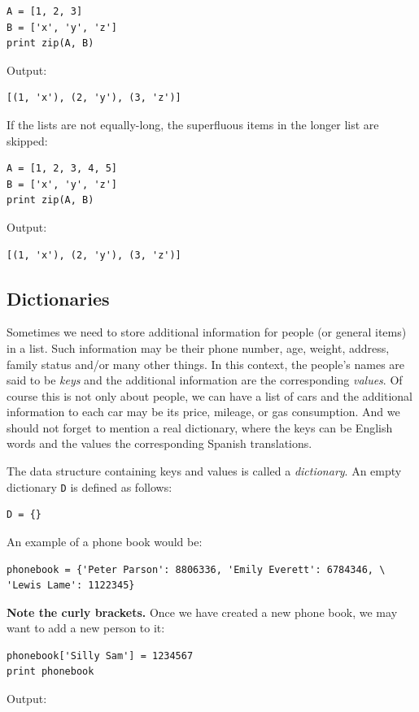 \begin{verbatim}
A = [1, 2, 3]
B = ['x', 'y', 'z']
print zip(A, B)
\end{verbatim}
Output:

\begin{verbatim}
[(1, 'x'), (2, 'y'), (3, 'z')]
\end{verbatim}
If the lists are not equally-long, the superfluous items in the longer list 
are skipped:

\begin{verbatim}
A = [1, 2, 3, 4, 5]
B = ['x', 'y', 'z']
print zip(A, B)
\end{verbatim}
Output:

\begin{verbatim}
[(1, 'x'), (2, 'y'), (3, 'z')]
\end{verbatim}

\subsection{Dictionaries}

Sometimes we need to store additional information for 
people (or general items) in a list. Such information may be  
their phone number, age, weight, address, family 
status and/or many other things. In this context, the 
people's names are said to be {\em keys} and the additional 
information are the corresponding {\em values}. Of course this 
is not only about people, we can have a list of cars and the 
additional information to each car may be its price, mileage, or
gas consumption. And we should not forget to mention a real 
dictionary, where the keys can be English words and the values the 
corresponding Spanish translations.

The data structure containing keys and values is called a {\em dictionary}. 
An empty dictionary {\tt D} is defined as follows:

\begin{verbatim}
D = {}
\end{verbatim}
An example of a phone book would be:

\begin{verbatim}
phonebook = {'Peter Parson': 8806336, 'Emily Everett': 6784346, \
'Lewis Lame': 1122345}
\end{verbatim}
{\bf Note the curly brackets.} 
Once we have created a new phone book, we may want to add a new person to it:

\begin{verbatim}
phonebook['Silly Sam'] = 1234567
print phonebook
\end{verbatim}
Output:

